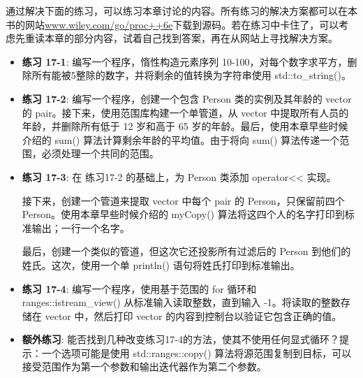 通过解决下面的练习，可以练习本章讨论的内容。所有练习的解决方案都可以在本书的网站\url{www.wiley.com/go/proc++6e}下载到源码。若在练习中卡住了，可以考虑先重读本章的部分内容，试着自己找到答案，再在从网站上寻找解决方案。

\begin{itemize}
\item
\textbf{练习 17-1}: 编写一个程序，惰性构造元素序列 10-100，对每个数字求平方，删除所有能被5整除的数字，并将剩余的值转换为字符串使用 std::to\_string()。

\item
\textbf{练习 17-2}: 编写一个程序，创建一个包含 Person 类的实例及其年龄的 vector 的 pair。接下来，使用范围库构建一个单管道，从 vector 中提取所有人员的年龄，并删除所有低于 12 岁和高于 65 岁的年龄。最后，使用本章早些时候介绍的 sum() 算法计算剩余年龄的平均值。由于将向 sum() 算法传递一个范围，必须处理一个共同的范围。

\item
\textbf{练习 17-3}: 在 练习17-2 的基础上，为 Person 类添加 operator<{}< 实现。

接下来，创建一个管道来提取 vector 中每个 pair 的 Person，只保留前四个 Person。使用本章早些时候介绍的 myCopy() 算法将这四个人的名字打印到标准输出；一行一个名字。

最后，创建一个类似的管道，但这次它还投影所有过滤后的 Person 到他们的姓氏。这次，使用一个单 println() 语句将姓氏打印到标准输出。

\item
\textbf{练习 17-4}: 编写一个程序，使用基于范围的 for 循环和 ranges::istream\_view() 从标准输入读取整数，直到输入 -1。将读取的整数存储在 vector 中，然后打印 vector 的内容到控制台以验证它包含正确的值。

\item
\textbf{额外练习}: 能否找到几种改变练习17-4的方法，使其不使用任何显式循环？提示：一个选项可能是使用 std::ranges::copy() 算法将源范围复制到目标，可以接受范围作为第一个参数和输出迭代器作为第二个参数。
\end{itemize}




